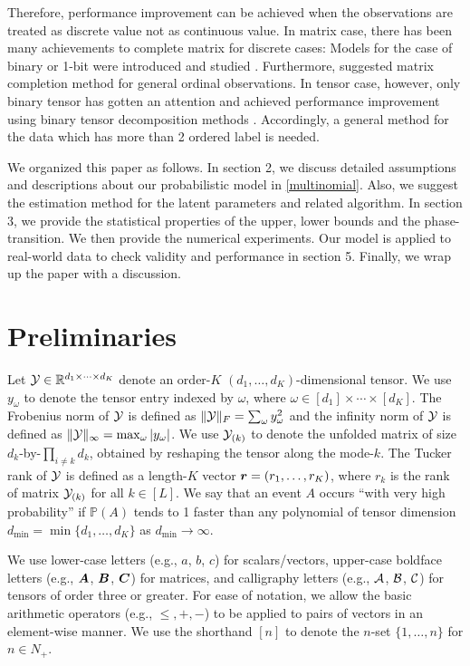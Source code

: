 \documentclass{article}
\theoremstyle{plain}
\theoremstyle{definition}
\begin{document}
Therefore, performance improvement can be achieved when the observations are treated as discrete value not as continuous value.
In matrix case, there has been many achievements to complete matrix for discrete cases: Models for the case of binary or 1-bit were introduced and studied \citep{Davenport20121BitMC,Bhaskar20151bitMC}. Furthermore,  \citet{Bhaskar2016ProbabilisticLM} suggested matrix completion method for general ordinal observations.
In tensor case, however, only binary tensor has gotten an attention and achieved performance improvement using binary tensor decomposition methods \citep{Hore2016TensorDF,Wang2018LearningFB,Hong2018GeneralizedCP,Hu2018TrainingBW}. Accordingly, a general method for the data which has more than 2 ordered label is needed.

We organized this paper as follows. In section 2, we discuss detailed assumptions and descriptions about our probabilistic model in \eqref{multinomial}. Also, we suggest the estimation method for the latent parameters and related algorithm. In section 3, we provide the statistical properties of the upper, lower bounds and the phase-transition. We then provide the numerical experiments. Our model is applied to  real-world data to check validity and performance in section 5. Finally, we wrap up the paper with a discussion.

\section{Preliminaries}
Let $\mathcal{Y}\in\mathbb{R}^{d_1\times \cdots \times d_K}$ denote an order-$K$ $(d_1,\ldots,d_K)$-dimensional tensor. We use $y_\omega$ to denote the tensor entry indexed by $\omega$, where $\omega\in[d_1]\times\cdots\times[d_K]$.  The Frobenius norm of $\mathcal{Y}$ is defined as $\lVert\mathcal{Y}\rVert_F=\sum_\omega y^2_\omega$ and the infinity norm of $\mathcal{Y}$ is defined as $\lVert\mathcal{Y}\rVert_\infty=\max_{\omega}|y_\omega|$. We use $\mathcal{Y}_{(k)}$ to denote the unfolded matrix of size $d_k$-by-$\prod_{i\neq k}d_k$, obtained by reshaping the tensor along the mode-$k$. The Tucker rank of $\mathcal{Y}$ is defined as a length-$K$ vector $\bm{r} = (r_1,\ldots,r_K)$, where $r_k$ is the rank of matrix $\mathcal{Y}_{(k)}$ for all $k \in[L]$. We say that an event $A$ occurs ``with very high probability'' if $\mathbb{P}(A)$ tends to 1 faster than any polynomial of tensor dimension $d_{\min}=\min\{d_1,\ldots,d_K\}$ as $d_{\min}\to\infty$.

We use lower-case letters (e.g., $a$, $b$, $c$) for scalars/vectors, upper-case boldface letters (e.g., $\bm A$, $\bm B$, $\bm C$) for matrices, and calligraphy letters (e.g., $\mathcal{A}$, $\mathcal{B}$, $\mathcal{C}$) for tensors of order three or greater. For ease of notation, we allow the basic arithmetic operators (e.g., $\leq, +, -$) to be applied to pairs of vectors in an element-wise manner. We use the shorthand $[n]$ to denote the $n$-set $\{1,\ldots,n\}$ for $n \in N_{+}$.
\end{document}
